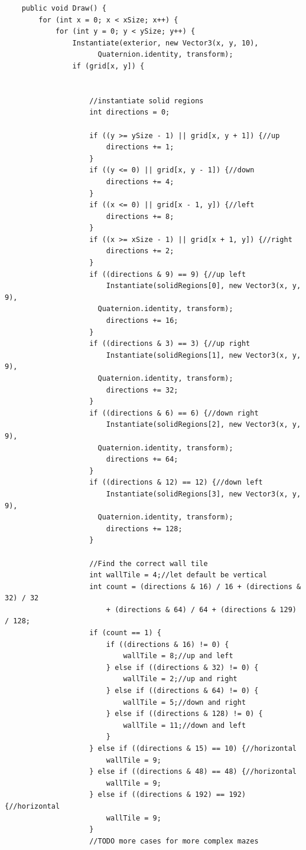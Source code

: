 \documentclass[12pt]{amsbook}
\theoremstyle{definition}
\theoremstyle{remark}
\numberwithin{figure}{chapter}
\numberwithin{table}{chapter}
\numberwithin{section}{chapter}
\numberwithin{equation}{section}
\begin{document}
\begin{verbatim}
    public void Draw() {
        for (int x = 0; x < xSize; x++) {
            for (int y = 0; y < ySize; y++) {
                Instantiate(exterior, new Vector3(x, y, 10),
                      Quaternion.identity, transform);
                if (grid[x, y]) {


                    //instantiate solid regions
                    int directions = 0;

                    if ((y >= ySize - 1) || grid[x, y + 1]) {//up
                        directions += 1;
                    }
                    if ((y <= 0) || grid[x, y - 1]) {//down
                        directions += 4;
                    }
                    if ((x <= 0) || grid[x - 1, y]) {//left
                        directions += 8;
                    }
                    if ((x >= xSize - 1) || grid[x + 1, y]) {//right
                        directions += 2;
                    }
                    if ((directions & 9) == 9) {//up left
                        Instantiate(solidRegions[0], new Vector3(x, y, 9),
                      Quaternion.identity, transform);
                        directions += 16;
                    }
                    if ((directions & 3) == 3) {//up right
                        Instantiate(solidRegions[1], new Vector3(x, y, 9),
                      Quaternion.identity, transform);
                        directions += 32;
                    }
                    if ((directions & 6) == 6) {//down right
                        Instantiate(solidRegions[2], new Vector3(x, y, 9),
                      Quaternion.identity, transform);
                        directions += 64;
                    }
                    if ((directions & 12) == 12) {//down left
                        Instantiate(solidRegions[3], new Vector3(x, y, 9),
                      Quaternion.identity, transform);
                        directions += 128;
                    }

                    //Find the correct wall tile
                    int wallTile = 4;//let default be vertical
                    int count = (directions & 16) / 16 + (directions & 32) / 32
                        + (directions & 64) / 64 + (directions & 129) / 128;
                    if (count == 1) {
                        if ((directions & 16) != 0) {
                            wallTile = 8;//up and left
                        } else if ((directions & 32) != 0) {
                            wallTile = 2;//up and right
                        } else if ((directions & 64) != 0) {
                            wallTile = 5;//down and right
                        } else if ((directions & 128) != 0) {
                            wallTile = 11;//down and left
                        }
                    } else if ((directions & 15) == 10) {//horizontal
                        wallTile = 9;
                    } else if ((directions & 48) == 48) {//horizontal
                        wallTile = 9;
                    } else if ((directions & 192) == 192) {//horizontal
                        wallTile = 9;
                    }
                    //TODO more cases for more complex mazes



\end{verbatim}
\end{document}
